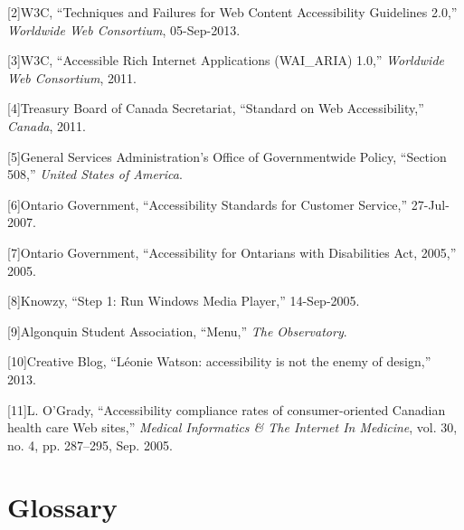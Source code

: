 \documentclass[]{article}
\begin{document}
{[}2{]}W3C, ``Techniques and Failures for Web Content Accessibility
Guidelines 2.0,'' \emph{Worldwide Web Consortium}, 05-Sep-2013.

{[}3{]}W3C, ``Accessible Rich Internet Applications (WAI\_ARIA) 1.0,''
\emph{Worldwide Web Consortium}, 2011.

{[}4{]}Treasury Board of Canada Secretariat, ``Standard on Web
Accessibility,'' \emph{Canada}, 2011.

{[}5{]}General Services Administration's Office of Governmentwide
Policy, ``Section 508,'' \emph{United States of America}.

{[}6{]}Ontario Government, ``Accessibility Standards for Customer
Service,'' 27-Jul-2007.

{[}7{]}Ontario Government, ``Accessibility for Ontarians with
Disabilities Act, 2005,'' 2005.

{[}8{]}Knowzy, ``Step 1: Run Windows Media Player,'' 14-Sep-2005.

{[}9{]}Algonquin Student Association, ``Menu,'' \emph{The Observatory}.

{[}10{]}Creative Blog, ``Léonie Watson: accessibility is not the enemy
of design,'' 2013.

{[}11{]}L. O'Grady, ``Accessibility compliance rates of
consumer-oriented Canadian health care Web sites,'' \emph{Medical
Informatics \& The Internet In Medicine}, vol. 30, no. 4, pp. 287--295,
Sep. 2005.

\clearpage

\section{Glossary}\label{glossary}
\end{document}
